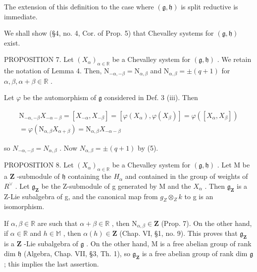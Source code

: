 The extension of this definition to the case where \((\mathfrak{g},\mathfrak{h})\) is split reductive is immediate.

We shall show (§4, no. 4, Cor. of Prop. 5) that Chevalley systems for \((\mathfrak{g},\mathfrak{h})\) exist.

PROPOSITION 7. Let \((X_{\alpha})_{\alpha \in \mathbb{R}}\) be a Chevalley system for \((\mathfrak{g},\mathfrak{h})\) . We retain the notation of Lemma 4. Then, \(\mathrm{N}_{-\alpha, - \beta} = \mathrm{N}_{\alpha ,\beta}\) and \(\mathrm{N}_{\alpha ,\beta} = \pm (q + 1)\) for \(\alpha ,\beta ,\alpha +\beta \in \mathbb{R}\) .

Let \(\varphi\) be the automorphism of \(\mathfrak{g}\) considered in Def. 3 (iii). Then

\[
\begin{array}{r} \mathrm{N} _ {- \alpha , - \beta} X _ {- \alpha - \beta} = [ X _ {- \alpha}, X _ {- \beta} ] = [ \varphi (X _ {\alpha}), \varphi (X _ {\beta}) ] = \varphi ([ X _ {\alpha}, X _ {\beta} ]) \\ = \varphi (\mathrm{N} _ {\alpha , \beta} X _ {\alpha + \beta}) = \mathrm{N} _ {\alpha , \beta} X _ {- \alpha - \beta} \end{array}
\]

so \(N_{-\alpha,-\beta}=N_{\alpha,\beta}\) . Now \(N_{\alpha,\beta}=\pm(q+1)\) by (5).

PROPOSITION 8. Let \((X_{\alpha})_{\alpha \in \mathbb{R}}\) be a Chevalley system for \((\mathfrak{g},\mathfrak{h})\) . Let \(\mathrm{M}\) be a \(\mathbf{Z}\) -submodule of \(\mathfrak{h}\) containing the \(H_{\alpha}\) and contained in the group of weights of \(R^{\vee}\) . Let \(\mathfrak{g}_{\mathbf{Z}}\) be the Z-submodule of g generated by M and the \(X_{\alpha}\) . Then \(\mathfrak{g}_{\mathbf{Z}}\) is a Z-Lie subalgebra of g, and the canonical map from \(g_{Z} \otimes_{Z} k\) to g is an isomorphism.

If \(\alpha, \beta \in \mathbb{R}\) are such that \(\alpha + \beta \in \mathbb{R}\) , then \(\mathrm{N}_{\alpha, \beta} \in \mathbf{Z}\) (Prop. 7). On the other hand, if \(\alpha \in \mathbb{R}\) and \(h \in \mathbb{M}\) , then \(\alpha(h) \in \mathbf{Z}\) (Chap. VI, §1, no. 9). This proves that \(\mathfrak{g}_{\mathbf{Z}}\) is a \(\mathbf{Z}\) -Lie subalgebra of \(\mathfrak{g}\) . On the other hand, M is a free abelian group of rank dim \(\mathfrak{h}\) (Algebra, Chap. VII, §3, Th. 1), so \(\mathfrak{g}_{\mathbf{Z}}\) is a free abelian group of rank dim \(\mathfrak{g}\) ; this implies the last assertion.

